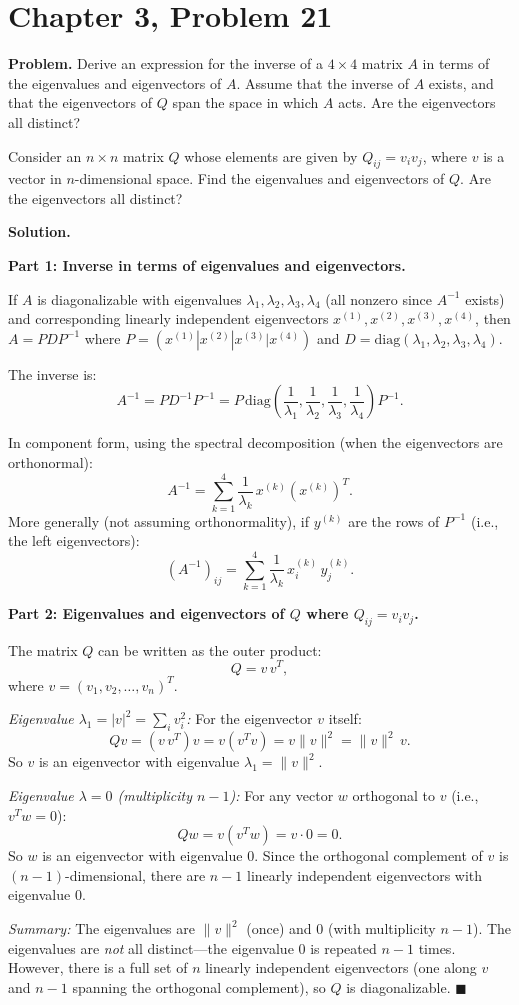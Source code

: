 \documentclass[12pt]{article}
\begin{document}
\section*{Chapter 3, Problem 21}

\textbf{Problem.} Derive an expression for the inverse of a $4 \times 4$ matrix $A$ in terms of the eigenvalues and eigenvectors of $A$. Assume that the inverse of $A$ exists, and that the eigenvectors of $Q$ span the space in which $A$ acts. Are the eigenvectors all distinct?

Consider an $n \times n$ matrix $Q$ whose elements are given by $Q_{ij} = v_i v_j$, where $v$ is a vector in $n$-dimensional space. Find the eigenvalues and eigenvectors of $Q$. Are the eigenvectors all distinct?

\bigskip
\textbf{Solution.}

\textbf{Part 1: Inverse in terms of eigenvalues and eigenvectors.}

If $A$ is diagonalizable with eigenvalues $\lambda_1, \lambda_2, \lambda_3, \lambda_4$ (all nonzero since $A^{-1}$ exists) and corresponding linearly independent eigenvectors $x^{(1)}, x^{(2)}, x^{(3)}, x^{(4)}$, then $A = PDP^{-1}$ where $P = (x^{(1)} | x^{(2)} | x^{(3)} | x^{(4)})$ and $D = \text{diag}(\lambda_1, \lambda_2, \lambda_3, \lambda_4)$.

The inverse is:
\[
A^{-1} = PD^{-1}P^{-1} = P\,\text{diag}\!\left(\frac{1}{\lambda_1}, \frac{1}{\lambda_2}, \frac{1}{\lambda_3}, \frac{1}{\lambda_4}\right)P^{-1}.
\]

In component form, using the spectral decomposition (when the eigenvectors are orthonormal):
\[
A^{-1} = \sum_{k=1}^{4} \frac{1}{\lambda_k}\, x^{(k)} (x^{(k)})^T.
\]
More generally (not assuming orthonormality), if $y^{(k)}$ are the rows of $P^{-1}$ (i.e., the left eigenvectors):
\[
(A^{-1})_{ij} = \sum_{k=1}^{4} \frac{1}{\lambda_k}\, x^{(k)}_i\, y^{(k)}_j.
\]

\medskip
\textbf{Part 2: Eigenvalues and eigenvectors of $Q$ where $Q_{ij} = v_i v_j$.}

The matrix $Q$ can be written as the outer product:
\[
Q = v\, v^T,
\]
where $v = (v_1, v_2, \ldots, v_n)^T$.

\textit{Eigenvalue $\lambda_1 = |v|^2 = \sum_i v_i^2$:} For the eigenvector $v$ itself:
\[
Qv = (v\,v^T)v = v(v^T v) = v \|v\|^2 = \|v\|^2\, v.
\]
So $v$ is an eigenvector with eigenvalue $\lambda_1 = \|v\|^2$.

\textit{Eigenvalue $\lambda = 0$ (multiplicity $n-1$):} For any vector $w$ orthogonal to $v$ (i.e., $v^T w = 0$):
\[
Qw = v(v^T w) = v \cdot 0 = 0.
\]
So $w$ is an eigenvector with eigenvalue 0. Since the orthogonal complement of $v$ is $(n-1)$-dimensional, there are $n-1$ linearly independent eigenvectors with eigenvalue 0.

\medskip
\textit{Summary:} The eigenvalues are $\|v\|^2$ (once) and $0$ (with multiplicity $n-1$). The eigenvalues are \emph{not} all distinct---the eigenvalue 0 is repeated $n-1$ times. However, there is a full set of $n$ linearly independent eigenvectors (one along $v$ and $n-1$ spanning the orthogonal complement), so $Q$ is diagonalizable. \hfill $\blacksquare$
\end{document}

